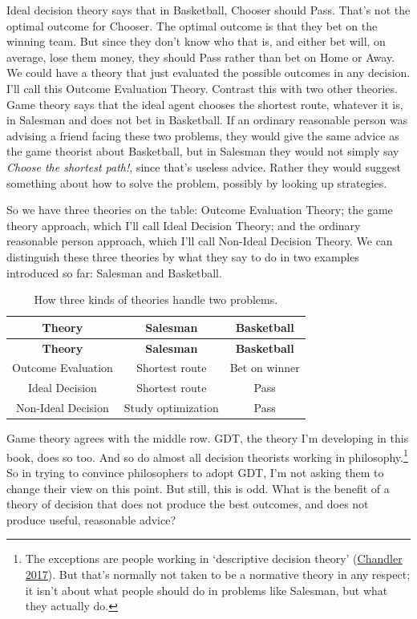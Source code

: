 \documentclass[
  12pt,
  letterpaper,
  DIV=11,
  numbers=noendperiod]{scrreprt}
\begin{document}
Ideal decision theory says that in Basketball, Chooser should Pass.
That's not the optimal outcome for Chooser. The optimal outcome is that
they bet on the winning team. But since they don't know who that is, and
either bet will, on average, lose them money, they should Pass rather
than bet on Home or Away. We could have a theory that just evaluated the
possible outcomes in any decision. I'll call this Outcome Evaluation
Theory. Contrast this with two other theories. Game theory says that the
ideal agent chooses the shortest route, whatever it is, in Salesman and
does not bet in Basketball. If an ordinary reasonable person was
advising a friend facing these two problems, they would give the same
advice as the game theorist about Basketball, but in Salesman they would
not simply say \emph{Choose the shortest path!}, since that's useless
advice. Rather they would suggest something about how to solve the
problem, possibly by looking up strategies.

So we have three theories on the table: Outcome Evaluation Theory; the
game theory approach, which I'll call Ideal Decision Theory; and the
ordinary reasonable person approach, which I'll call Non-Ideal Decision
Theory. We can distinguish these three theories by what they say to do
in two examples introduced so far: Salesman and Basketball.

\hypertarget{tbl-three-theories}{}
\begin{longtable}[]{@{}ccc@{}}
\caption{\label{tbl-three-theories}How three kinds of theories handle
two problems.}\tabularnewline
\toprule\noalign{}
\textbf{Theory} & \textbf{Salesman} & \textbf{Basketball} \\
\midrule\noalign{}
\endfirsthead
\toprule\noalign{}
\textbf{Theory} & \textbf{Salesman} & \textbf{Basketball} \\
\midrule\noalign{}
\endhead
\bottomrule\noalign{}
\endlastfoot
Outcome Evaluation & Shortest route & Bet on winner \\
Ideal Decision & Shortest route & Pass \\
Non-Ideal Decision & Study optimization & Pass \\
\end{longtable}

Game theory agrees with the middle row. GDT, the theory I'm developing
in this book, does so too. And so do almost all decision theorists
working in philosophy.\footnote{The exceptions are people working in
  `descriptive decision theory'
  (\protect\hyperlink{ref-ChandlerSEP}{Chandler 2017}). But that's
  normally not taken to be a normative theory in any respect; it isn't
  about what people should do in problems like Salesman, but what they
  actually do.} So in trying to convince philosophers to adopt GDT, I'm
not asking them to change their view on this point. But still, this is
odd. What is the benefit of a theory of decision that does not produce
the best outcomes, and does not produce useful, reasonable advice?
\end{document}
